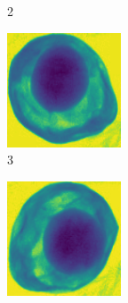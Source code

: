 \documentclass[11pt]{article}
\begin{document}
\begin{figure}[!h]
\begin{subfigure}[b]{0.22\textwidth}
         \caption{2}
         \label{fig:avo_1}
     \end{subfigure}
     \hfill
     \begin{subfigure}[b]{0.22\textwidth}
         \centering
         \includegraphics[width=\textwidth]{figurer/avocado_dataset/avo_2.jpg}
         \caption{3}
         \label{fig:avo_2}
     \end{subfigure}
     \hfill
     \begin{subfigure}[b]{0.22\textwidth}
         \centering
         \includegraphics[width=\textwidth]{figurer/avocado_dataset/avo_3.jpg}

\end{subfigure}
\end{figure}
\end{document}
